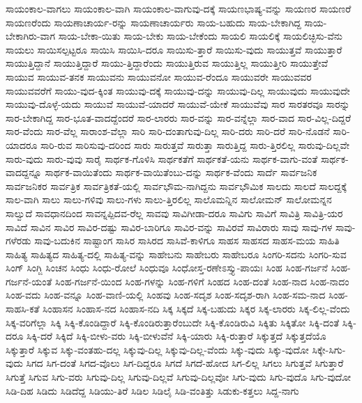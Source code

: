 {ಸಾಯಂಕಾಲ-ವಾಗಲು
ಸಾಯಂಕಾಲ-ವಾಗಿ
ಸಾಯಂಕಾಲ-ವಾಗುವು-ದಕ್ಕೆ
ಸಾಯಣಭಾಷ್ಯ-ವನ್ನು
ಸಾಯಣರ
ಸಾಯಣರೆ
ಸಾಯಣರೆಂದು
ಸಾಯಣಾಚಾರ್ಯ-ರನ್ನು
ಸಾಯಣಾಚಾರ್ಯರು
ಸಾಯ-ಬಹುದು
ಸಾಯ-ಬೇಕಾಗಿದ್ದ
ಸಾಯ-ಬೇಕಾಗಿರು-ವಾಗ
ಸಾಯ-ಬೇಕಾ-ಯಿತು
ಸಾಯ-ಬೇಕು
ಸಾಯ-ಬೇಕೆಂದು
ಸಾಯಲಿ
ಸಾಯಲಿಕ್ಕೆ
ಸಾಯಲಿಚ್ಛಿಸು-ವೆನು
ಸಾಯಲು
ಸಾಯಿಸಲ್ಪಟ್ಟರೂ
ಸಾಯಿಸಿ
ಸಾಯಿಸಿ-ದರೂ
ಸಾಯಿಸು-ತ್ತಾರೆ
ಸಾಯಿಸು-ವುದು
ಸಾಯುತ್ತವೆ
ಸಾಯುತ್ತಾರೆ
ಸಾಯುತ್ತಿದ್ದಾನೆ
ಸಾಯುತ್ತಿದ್ದಾರೆ
ಸಾಯು-ತ್ತಿದ್ದಾರೆಂದು
ಸಾಯುತ್ತಿರುವ
ಸಾಯುತ್ತಿಲ್ಲ
ಸಾಯುತ್ತೀರಿ
ಸಾಯುತ್ತೇವೆ
ಸಾಯುವ
ಸಾಯುವ-ತನಕ
ಸಾಯುವನು
ಸಾಯುವನೋ
ಸಾಯುವ-ರೆಂದೂ
ಸಾಯುವರೇ
ಸಾಯುವವರ
ಸಾಯುವವರೆಗೆ
ಸಾಯು-ವುದ-ಕ್ಕಿಂತ
ಸಾಯುವು-ದಕ್ಕೆ
ಸಾಯುವು-ದನ್ನು
ಸಾಯುವು-ದಿಲ್ಲ
ಸಾಯುವುದು
ಸಾಯುವುದೇ
ಸಾಯುವು-ದೊಳ್ಳೆ-ಯದು
ಸಾಯುವೆ
ಸಾಯುವೆ-ಯಾದರೆ
ಸಾಯುವೆ-ಯೇಕೆ
ಸಾಯುವೆವು
ಸಾರ
ಸಾರತರವೂ
ಸಾರನ್ನು
ಸಾರ-ಬೇಕಾಗಿದ್ದ
ಸಾರ-ಭೂತ-ವಾದದ್ದೆಂದರೆ
ಸಾರ-ಲಾರರು
ಸಾರ-ವನ್ನು
ಸಾರ-ವನ್ನೆಲ್ಲಾ
ಸಾರ-ವಾದ
ಸಾರ-ವಿಲ್ಲ-ದಿದ್ದರೆ
ಸಾರ-ವೆಂದು
ಸಾರ-ವೆಲ್ಲ
ಸಾರಾಂಶ-ವೆಲ್ಲಾ
ಸಾರಿ
ಸಾರಿ-ದಂತಾಗುವು-ದಿಲ್ಲ
ಸಾರಿ-ದರು
ಸಾರಿ-ದರೆ
ಸಾರಿ-ನೊಡನೆ
ಸಾರಿ-ಯಾದರೂ
ಸಾರಿ-ರುವ
ಸಾರಿಸುವು-ದರಿಂದ
ಸಾರು
ಸಾರುತ್ತವೆ
ಸಾರುತ್ತಾ
ಸಾರುತ್ತಿದ್ದ
ಸಾರು-ತ್ತಿರಲಿಲ್ಲ
ಸಾರುವು-ದಿಲ್ಲವೇ
ಸಾರು-ವುದು
ಸಾರು-ವುವು
ಸಾರೈ
ಸಾರ್ಥಕ-ಗೊಳಿಸಿ
ಸಾರ್ಥಕತೆಗೆ
ಸಾರ್ಥಕತೆ-ಯನು
ಸಾರ್ಥಕ-ವಾಗು-ವಂತೆ
ಸಾರ್ಥಕ-ವಾದದ್ದನ್ನೂ
ಸಾರ್ಥಕ-ವಾಯಿತೆಂದು
ಸಾರ್ಥಕ-ವಾಯಿತೆಂಬು-ದನ್ನು
ಸಾರ್ಥಕ-ವೆಂದು
ಸಾರ್ದೆ
ಸಾರ್ವಜನಿಕ
ಸಾರ್ವಜನಿಕರ
ಸಾರ್ವತ್ರಿಕ
ಸಾರ್ವತ್ರಿಕತೆ-ಯಲ್ಲಿ
ಸಾರ್ವಭೌಮ-ನಾಗಿದ್ದನು
ಸಾರ್ವಭೌಮಿಕ
ಸಾಲದು
ಸಾಲದೆ
ಸಾಲದ್ದಕ್ಕೆ
ಸಾಲ-ವಾಗಿ
ಸಾಲು
ಸಾಲು-ಗಳಿವು
ಸಾಲು-ಗಳು
ಸಾಲು-ತ್ತಿರಲಿಲ್ಲ
ಸಾಲೊಮನ್ನಿನ
ಸಾಲೋಮನ್
ಸಾಲೋಮನ್ನನ
ಸಾಲ್ವುದೆ
ಸಾವಧಾನದಿಂದ
ಸಾವನ್ನಪ್ಪಿದವ-ರೆಲ್ಲ
ಸಾವವು
ಸಾವಿಗೀಡಾ-ದರೂ
ಸಾವಿಗು
ಸಾವಿಗೆ
ಸಾವಿತ್ರಿ
ಸಾವಿತ್ರಿ-ಯರ
ಸಾವಿದೆ
ಸಾವಿನ
ಸಾವಿರ
ಸಾವಿರ-ದಷ್ಟು
ಸಾವಿರ-ಬಾರಿಗೂ
ಸಾವಿರ-ವನ್ನು
ಸಾವಿರವೆ
ಸಾವಿರಾರು
ಸಾವು
ಸಾವು-ಗಳ
ಸಾವು-ಗಳೆರಡು
ಸಾವು-ಬದುಕಿನ
ಸಾಷ್ಟಾಂಗ
ಸಾಸಿರ
ಸಾಸಿರದ
ಸಾಸಿವೆ-ಕಾಳಿಗೂ
ಸಾಹಸ
ಸಾಹಸದ
ಸಾಹಸ-ಮಯ
ಸಾಹಿತಿ
ಸಾಹಿತ್ಯ
ಸಾಹಿತ್ಯದ
ಸಾಹಿತ್ಯ-ದಲ್ಲಿ
ಸಾಹಿತ್ಯ-ವನ್ನು
ಸಾಹೇಬನು
ಸಾಹೇಬರು
ಸಾಹೇಬರೂ
ಸಿಂಗರಿ-ಸದನು
ಸಿಂಗರಿ-ಸುವ
ಸಿಂಗ್
ಸಿಂಗ್ಜಿ
ಸಿಂಚನ
ಸಿಂಧು
ಸಿಂಧು-ರೋಲೆ
ಸಿಂಧುವೂ
ಸಿಂಧೋಸ್ತ-ರಣೇಽಸ್ತ್ಯು-ಪಾಯಃ
ಸಿಂಹ
ಸಿಂಹ-ಗರ್ಜನೆ
ಸಿಂಹ-ಗರ್ಜನೆ-ಯಂತೆ
ಸಿಂಹ-ಗರ್ಜನೆ-ಯಿಂದ
ಸಿಂಹ-ಗಳನ್ನು
ಸಿಂಹ-ಗಳಿಗೆ
ಸಿಂಹದ
ಸಿಂಹ-ದಂತೆ
ಸಿಂಹ-ನಾದ
ಸಿಂಹ-ನಾದಂ
ಸಿಂಹ-ವದು
ಸಿಂಹ-ವನ್ನೂ
ಸಿಂಹ-ವಾಣಿ-ಯಲ್ಲಿ
ಸಿಂಹವು
ಸಿಂಹ-ಸದೃಶ
ಸಿಂಹ-ಸದೃಶ-ರಾಗಿ
ಸಿಂಹ-ಸಮ-ನಾದ
ಸಿಂಹ-ಸಾಹಸಿ-ಕತೆ
ಸಿಂಹಾಸನ
ಸಿಂಹಾಸ-ನದ
ಸಿಂಹಾಸ-ನದಿ
ಸಿಕ್ಕ
ಸಿಕ್ಕದೆ
ಸಿಕ್ಕ-ಬಹುದು
ಸಿಕ್ಕರ
ಸಿಕ್ಕ-ಲಾರರು
ಸಿಕ್ಕ-ಲಿಲ್ಲ-ವೆಂದು
ಸಿಕ್ಕ-ವರಿಗೆಲ್ಲಾ
ಸಿಕ್ಕಿ
ಸಿಕ್ಕಿ-ಕೊಂಡಿದ್ದಾರೆ
ಸಿಕ್ಕಿ-ಕೊಂಡಿರುತ್ತಾರೆಂಬುದೇ
ಸಿಕ್ಕಿ-ಕೊಂಡಿರುವಿ
ಸಿಕ್ಕಿತು
ಸಿಕ್ಕಿತೋ
ಸಿಕ್ಕಿ-ದಂತೆ
ಸಿಕ್ಕಿ-ದರೂ
ಸಿಕ್ಕಿ-ದರೆ
ಸಿಕ್ಕಿದೆ
ಸಿಕ್ಕಿ-ಬೀಳು-ವರು
ಸಿಕ್ಕಿ-ಬೀಳುವೆನೆ
ಸಿಕ್ಕಿ-ಯಾರು
ಸಿಕ್ಕಿ-ರುತ್ತಾರೆ
ಸಿಕ್ಕುತ್ತದೆ
ಸಿಕ್ಕುತ್ತದೆಯೊ
ಸಿಕ್ಕುತ್ತಾರೆ
ಸಿಕ್ಕುವ
ಸಿಕ್ಕು-ವಂತಹು-ದಲ್ಲ
ಸಿಕ್ಕುವು-ದಿಲ್ಲ
ಸಿಕ್ಕುವು-ದಿಲ್ಲ-ವೆಂದು
ಸಿಕ್ಕು-ವುದು
ಸಿಕ್ಕು-ವುದೋ
ಸಿಕ್ಕೇ-ಸಿಗು-ವುದು
ಸಿಗದ
ಸಿಗ-ದಂತೆ
ಸಿಗದ-ವೊಲು
ಸಿಗ-ದಿದ್ದರೂ
ಸಿಗದೆ
ಸಿಗದೆ-ಹೋದ
ಸಿಗ-ಲಿಲ್ಲ
ಸಿಗಲು
ಸಿಗುತ್ತವೆ
ಸಿಗುತ್ತಾರೆ
ಸಿಗುತ್ತೆ
ಸಿಗುವ
ಸಿಗು-ವರು
ಸಿಗುವು-ದಿಲ್ಲ
ಸಿಗುವು-ದಿಲ್ಲವೆ
ಸಿಗುವು-ದಿಲ್ಲವೋ
ಸಿಗು-ವುದು
ಸಿಗು-ವುದೊ
ಸಿಗು-ವುದೋ
ಸಿಡಿ-ದಿಹ
ಸಿಡಿದು
ಸಿಡಿದೆದ್ದ
ಸಿಡಿಯು-ತಿರೆ
ಸಿಡಿಲ
ಸಿಡಿಲೈ
ಸಿಡಿ-ವಂತಿತ್ತು
ಸಿಡುಕು-ಕತ್ತಲು
ಸಿದ್ದ-ನಾಗು
}
